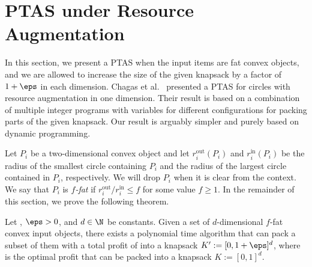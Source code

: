 \section{\textsf{PTAS} under Resource Augmentation}
\label{sec:ptas-ra}
In this section, we present a \textsf{PTAS} when the input items are fat convex objects, and we are allowed to increase the size of the given knapsack by a factor of $1+\eps$ in each dimension. Chagas et al.~\cite{MiyazawaWAOA} presented a \textsf{PTAS} for circles with resource augmentation in one dimension. Their result is based on a combination of multiple integer programs with variables for different configurations for packing parts of the given knapsack.
Our result is arguably simpler and purely based on dynamic programming.


Let $P_i$ be a two-dimensional convex object and let $r_{i}^{\mathrm{out}}(P_i)$ and $r_{i}^{\mathrm{in}}(P_i)$ be
the radius of the smallest circle containing $P_{i}$ and the radius
of the largest circle contained in $P_i$, respectively. 
We will drop $P_i$ when it is clear from the context. 
We say that $P_i$ is $f$\emph{-fat} if  $r_{i}^{\mathrm{out}}/r_{i}^{\mathrm{in}}\le f$
for some value $f \ge 1$. In the remainder of this section, we prove the following theorem.

\begin{theorem}
	\label{thm:fat-ra}
	Let , $\eps>0$, and $d\in \N$ be constants. Given a set of $d$-dimensional $f$-fat convex input objects, there exists a polynomial time algorithm that can pack a subset of them with a total profit of  into a knapsack $K':=[0, 1+\eps]^d$, where  is the optimal profit that can be packed into a knapsack $K:=[0, 1]^d$.
\end{theorem}

